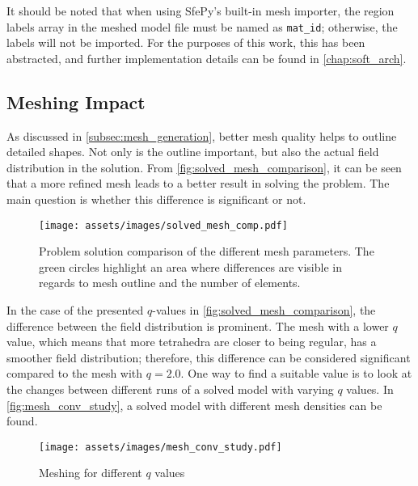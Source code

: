 It should be noted that when using SfePy's built-in mesh importer, the region labels array in the meshed model file must be named as \texttt{mat\_id}; otherwise, the labels will not be imported. For the purposes of this work, this has been abstracted, and further implementation details can be found in \autoref{chap:soft_arch}.

\subsection{Meshing Impact}
\label{sec:mesh_quality}

As discussed in \ref{subsec:mesh_generation}, better mesh quality helps to outline detailed shapes. Not only is the outline important, but also the actual field distribution in the solution. From \autoref{fig:solved_mesh_comparison}, it can be seen that a more refined mesh leads to a better result in solving the problem. The main question is whether this difference is significant or not.

\begin{figure}[H]
    \centering
    \texttt{[image: assets/images/solved\_mesh\_comp.pdf]}
    \caption[Problem solution comparison for the different $q$ mesh parameters.]{Problem solution comparison of the different mesh parameters. The green circles highlight an area where differences are visible in regards to mesh outline and the number of elements.}
    \label{fig:solved_mesh_comparison}
\end{figure}

In the case of the presented $q$-values in \autoref{fig:solved_mesh_comparison}, the difference between the field distribution is prominent. The mesh with a lower $q$ value, which means that more tetrahedra are closer to being regular, has a smoother field distribution; therefore, this difference can be considered significant compared to the mesh with $q=2.0$. One way to find a suitable value is to look at the changes between different runs of a solved model with varying $q$ values. In \autoref{fig:mesh_conv_study}, a solved model with different mesh densities can be found.

\begin{figure}[H]
    \centering
    \texttt{[image: assets/images/mesh\_conv\_study.pdf]}
    \caption{Meshing for different $q$ values}
    \label{fig:mesh_conv_study}
\end{figure}

